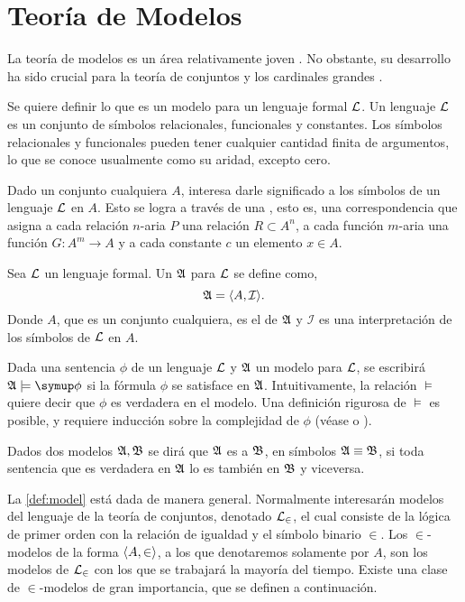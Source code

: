 \section{Teoría de Modelos}
\label{sec:models}

La teoría de modelos es un área relativamente joven \autocite[pág. 3]{chang_model_2012}.
No obstante, su desarrollo ha sido crucial para la teoría de conjuntos y los
cardinales grandes \autocite[pág. xv]{kanamori_higher_2009}.

Se quiere definir lo que es un modelo para un lenguaje formal $\mathcal { L }$.
Un lenguaje $\mathcal { L }$ es un conjunto de símbolos relacionales, funcionales y constantes.
Los símbolos relacionales y funcionales pueden tener cualquier cantidad finita de argumentos,
lo que se conoce usualmente como su aridad, excepto cero.

Dado un conjunto cualquiera $A$, interesa darle significado a los símbolos de un
lenguaje $\mathcal { L }$ en $A$. Esto se logra a través de una , esto es,
una correspondencia que asigna a cada relación $n$-aria $P$ una relación
$R\subset A^n$, a cada función $m$-aria una función $G\colon A^m\to A$ y a cada
constante $c$ un elemento $x\in A$.

\begin{defi}\label{def:model}
    Sea $\mathcal { L }$ un lenguaje formal. Un  $\mathfrak { A }$ para $\mathcal { L }$ se define como,
    \[
        \mathfrak { A } = \langle A, \mathcal{I} \rangle.
    \]
    Donde $A$, que es un conjunto cualquiera, es el  de $\mathfrak { A }$ y
    $\mathcal{I}$ es una interpretación de los símbolos de $\mathcal { L }$ en $A$.
\end{defi}

Dada una sentencia $\phi$ de un lenguaje $\mathcal { L }$ y $\mathfrak { A }$ un modelo para $\mathcal { L }$,
se escribirá $\model{A}\models\phi$ si la fórmula $\phi$ se satisface en $\mathfrak { A }$.
Intuitivamente, la relación $\models$ quiere decir que $\phi$ es verdadera en el modelo.
Una definición rigurosa de $\models$ es posible, y requiere inducción sobre la complejidad
de $\phi$ (véase \autocite[\S 1.3]{chang_model_2012} o \autocite[\S 12]{jech_set_2003}).

Dados dos modelos $\mathfrak { A }, \mathfrak { B }$ se dirá que $\mathfrak { A }$ es  a $\mathfrak { B }$, en símbolos $\mathfrak { A }\equiv \mathfrak { B }$, si toda sentencia
que es verdadera en $\mathfrak { A }$ lo es también en $\mathfrak { B }$ y viceversa.

La \cref{def:model} está dada de manera general. Normalmente interesarán modelos
del lenguaje de la teoría de conjuntos, denotado $\mathcal { L }_\in$, el cual consiste de la lógica de
primer orden con la relación de igualdad y el símbolo binario $\in$.
Los $\in$-modelos de la forma $\langle A,\in \rangle$, a los que denotaremos
solamente por $A$, son los modelos de $\mathcal { L }_\in$ con los que se trabajará la mayoría del tiempo.
Existe una clase de $\in$-modelos de gran importancia, que se definen a continuación.

